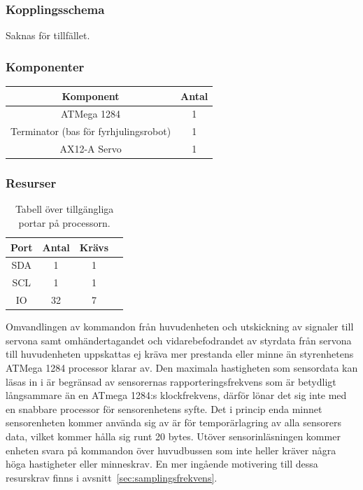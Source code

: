 \documentclass{article}
\begin{document}
\subsubsection{Kopplingsschema}
Saknas för tillfället.

\subsubsection{Komponenter}

\begin{table}[H]
  \centering
  \begin{tabular}{ | c | c |}
    \hline
    \textbf{Komponent} & \textbf{Antal} \\
    \hline
    ATMega 1284 & 1 \\
    \hline
    Terminator (bas för fyrhjulingsrobot) & 1 \\
    \hline
    AX12-A Servo & 1 \\
    \hline

  \end{tabular}
\end{table}

\subsubsection{Resurser}
\begin{table}[H]
  \centering
  \begin{tabular}{ | c | c | c | c |}
    \hline
    \textbf{Port} & \textbf{Antal} & \textbf{Krävs} \\
    \hline
    SDA & 1 & 1 \\
    \hline
    SCL & 1 & 1 \\
    \hline
    IO & 32 & 7 \\
    \hline
  \end{tabular}
  \caption{Tabell över tillgängliga portar på processorn.}
\end{table}

Omvandlingen av kommandon från huvudenheten och utskickning av signaler till servona samt omhändertagandet och vidarebefodrandet av styrdata från servona till huvudenheten uppskattas ej kräva mer prestanda eller minne än styrenhetens ATMega 1284 processor klarar av.
\newline\newline
Den maximala hastigheten som sensordata kan läsas in i är begränsad av sensorernas rapporteringsfrekvens som är betydligt långsammare än en ATmega 1284:s klockfrekvens, därför lönar det sig inte med en snabbare processor för sensorenhetens syfte. Det i princip enda minnet sensorenheten kommer använda sig av är för temporärlagring av alla sensorers data, vilket kommer hålla sig runt 20 bytes. Utöver sensorinläsningen kommer enheten svara på kommandon över huvudbussen som inte heller kräver några höga hastigheter eller minneskrav. En mer ingående motivering till dessa resurskrav finns i avsnitt~\ref{sec:samplingsfrekvens}.
\end{document}

